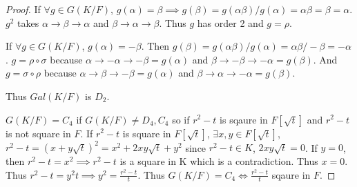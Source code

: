 \documentclass{article}
\begin{document}
\begin{proof}
    If $\forall g \in G(K / F)$, $g(\alpha) = \beta \implies g(\beta) = g(\alpha \beta) / g(\alpha) = \alpha \beta = \beta = \alpha$. $g^2$ takes $\alpha \to \beta \to \alpha$ and $\beta \to \alpha \to \beta$. Thus $g$ has order 2 and $g = \rho$. 
    
    If $\forall g \in G(K / F)$, $g(\alpha) = -\beta$. Then $g(\beta) = g(\alpha \beta) / g(\alpha) = \alpha \beta / -\beta = -\alpha$. $g = \rho \circ \sigma$ because $\alpha \to -\alpha \to -\beta = g(\alpha)$ and $\beta \to -\beta \to -\alpha = g(\beta)$. And $g = \sigma \circ \rho$ because $\alpha \to \beta \to -\beta = g(\alpha)$ and $\beta \to \alpha \to -\alpha = g(\beta)$. 
    
    Thus $Gal(K / F)$ is $D_2$. 
    
    $G(K / F) = C_4$ if $G(K / F) \neq D_4, C_4$ so if $r^2 - t$ is sqaure in $F[\sqrt{t}]$ and $r^2 - t$ is not square in $F$. If $r^2 - t$ is square in $F[\sqrt{t}]$, $\exists x, y \in F[\sqrt{t}]$, $r^2 - t = (x + y\sqrt{t})^2 = x^2 + 2xy\sqrt{t} + y^2$ since $r^2 - t \in K$, $2xy \sqrt{t} = 0$. If $y = 0$, then $r^2 - t = x^2 \implies r^2 - t$ is a square in K which is a contradiction. Thus $x = 0$. Thus $r^2 - t = y^2 t \implies y^2 = \frac{r^2 -t}{t}$. Thus $G(K / F) = C_4 \iff \frac{r^2 -t}{t}$ sqaure in $F$.
    

\end{proof}
\end{document}
